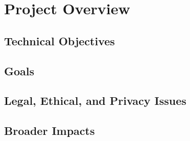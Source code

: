 \section{Project Overview}

\subsection{Technical Objectives}

\blindtext

\subsection{Goals}

\blindtext

\subsection{Legal, Ethical, and Privacy Issues}

\blindtext

\subsection{Broader Impacts}


